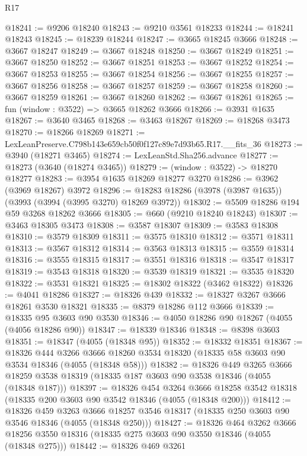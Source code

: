 \begin{lexlean}{R17}
\begin{coremodule}
@18241 := @9206 @18240
@18243 := @9210 @3561 @18233
@18244 := @18241 @18243
@18245 := @18239 @18244
@18247 := @3665 @18245 @3666
@18248 := @3667 @18247
@18249 := @3667 @18248
@18250 := @3667 @18249
@18251 := @3667 @18250
@18252 := @3667 @18251
@18253 := @3667 @18252
@18254 := @3667 @18253
@18255 := @3667 @18254
@18256 := @3667 @18255
@18257 := @3667 @18256
@18258 := @3667 @18257
@18259 := @3667 @18258
@18260 := @3667 @18259
@18261 := @3667 @18260
@18262 := @3667 @18261
@18265 := fun (window : @3522) => @3665 @18262 @3666
@18266 := @3931 @1635
@18267 := @3640 @3465
@18268 := @3463 @18267
@18269 := @18268 @3473
@18270 := @18266 @18269
@18271 := LexLeanPreserve.C798b143e659cb50f0f127c89e7d93b65.R17.__fits_36
@18273 := @3940 (@18271 @3465)
@18274 := LexLeanStd.Sha256.advance
@18277 := @18273 (@3640 (@18274 @3465))
@18279 := (window : @3522) -> @18270 @18277
@18283 := @3954 @1635 @18269 @18277 @3270
@18286 := @3962 (@3969 @18267) @3972
@18296 := @18283 @18286 (@3978 (@3987 @1635)) (@3993 (@3994 (@3995 @3270) @18269 @3972))
@18302 := @5509 @18286 @194 @59 @3268 @18262 @3666
@18305 := @660 (@9210 @18240 @18243)
@18307 := @3463 @18305 @3473
@18308 := @3587 @18307
@18309 := @3583 @18308
@18310 := @3579 @18309
@18311 := @3575 @18310
@18312 := @3571 @18311
@18313 := @3567 @18312
@18314 := @3563 @18313
@18315 := @3559 @18314
@18316 := @3555 @18315
@18317 := @3551 @18316
@18318 := @3547 @18317
@18319 := @3543 @18318
@18320 := @3539 @18319
@18321 := @3535 @18320
@18322 := @3531 @18321
@18325 := @18302 @18322 (@3462 @18322)
@18326 := @4041 @18286
@18327 := @18326 @439
@18332 := @18327 @3267 @3666 @18261 @3530 @18321
@18335 := @8379 @18286 @112 @3666
@18339 := @18335 @95 @3603 @90 @3530
@18346 := @4050 @18286 @90 @18267 (@4055 (@4056 @18286 @90))
@18347 := @18339 @18346
@18348 := @8398 @3603
@18351 := @18347 (@4055 (@18348 @95))
@18352 := @18332 @18351
@18367 := @18326
    @444
    @3266
    @3666
    @18260
    @3534
    @18320
    (@18335 @58 @3603 @90 @3534 @18346 (@4055 (@18348 @58)))
@18382 := @18326
    @449
    @3265
    @3666
    @18259
    @3538
    @18319
    (@18335 @187 @3603 @90 @3538 @18346 (@4055 (@18348 @187)))
@18397 := @18326
    @454
    @3264
    @3666
    @18258
    @3542
    @18318
    (@18335 @200 @3603 @90 @3542 @18346 (@4055 (@18348 @200)))
@18412 := @18326
    @459
    @3263
    @3666
    @18257
    @3546
    @18317
    (@18335 @250 @3603 @90 @3546 @18346 (@4055 (@18348 @250)))
@18427 := @18326
    @464
    @3262
    @3666
    @18256
    @3550
    @18316
    (@18335 @275 @3603 @90 @3550 @18346 (@4055 (@18348 @275)))
@18442 := @18326
    @469
    @3261

\end{coremodule}
\end{lexlean}
